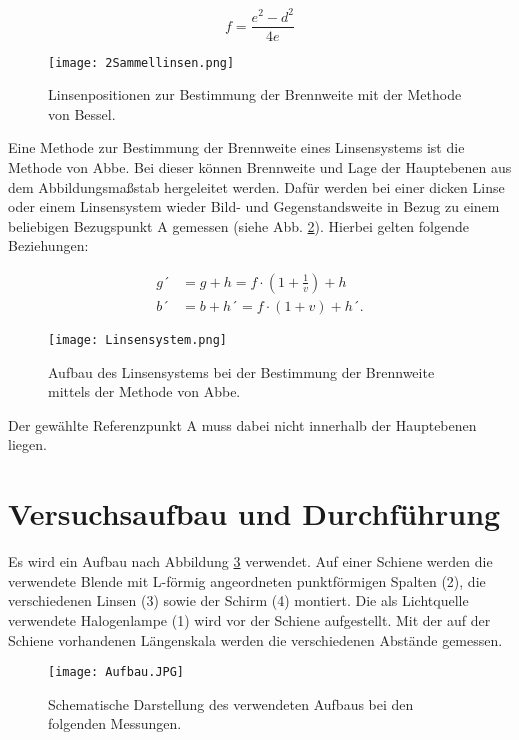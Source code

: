 \begin{equation}
  f = \frac{e^2 - d^2}{4e}
  \label{eqn:Bessel}
\end{equation}

\begin{figure}
  \centering
  \texttt{[image: 2Sammellinsen.png]}
  \caption{Linsenpositionen zur Bestimmung der Brennweite mit der Methode von Bessel.\cite{anleitung01}}
  \label{fig:2Sammellinsen}
\end{figure}

Eine Methode zur Bestimmung der Brennweite eines Linsensystems ist die Methode von Abbe. Bei
dieser können Brennweite und Lage der Hauptebenen aus dem Abbildungsmaßstab hergeleitet
werden. Dafür werden bei einer dicken Linse oder einem Linsensystem wieder Bild- und Gegenstandsweite in
Bezug zu einem beliebigen Bezugspunkt A gemessen (siehe Abb. \ref{fig:Linsensystem}).
Hierbei gelten folgende Beziehungen:

\begin{align}
  g´ &= g + h  = f \cdot \left( 1 + \frac{1}{v} \right) +h \\
  b´ &= b + h´ = f \cdot \left( 1 + v \right) + h´ .
\end{align}

\begin{figure}
  \centering
  \texttt{[image: Linsensystem.png]}
  \caption{Aufbau des Linsensystems bei der Bestimmung der Brennweite mittels der
  Methode von Abbe.\cite{anleitung01}}
  \label{fig:Linsensystem}
\end{figure}

Der gewählte Referenzpunkt A muss dabei nicht innerhalb der Hauptebenen liegen.

\section{Versuchsaufbau und Durchführung}

Es wird ein Aufbau nach Abbildung \ref{fig:Aufbau} verwendet. Auf einer
Schiene werden die verwendete Blende mit L-förmig angeordneten punktförmigen
Spalten (2), die verschiedenen Linsen (3) sowie der Schirm (4) montiert. Die als
Lichtquelle verwendete Halogenlampe (1) wird vor der Schiene aufgestellt.
Mit der auf der Schiene vorhandenen Längenskala werden die verschiedenen
Abstände gemessen.

\begin{figure}
  \centering
  \texttt{[image: Aufbau.JPG]}
  \caption{Schematische Darstellung des verwendeten Aufbaus bei den folgenden Messungen. \cite{anleitung01}}
  \label{fig:Aufbau}
\end{figure}

